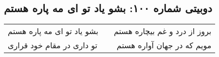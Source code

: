 \begin{center}
\section*{دوبیتی شماره ۱۰۰: بشو یاد تو ای مه پاره هستم}
\label{sec:100}
\begin{longtable}{l p{0.5cm} r}
بشو یاد تو ای مه پاره هستم
&&
بروز از درد و غم بیچاره هستم
\\
تو داری در مقام خود قراری
&&
مویم که در جهان آواره هستم
\\
\end{longtable}
\end{center}
